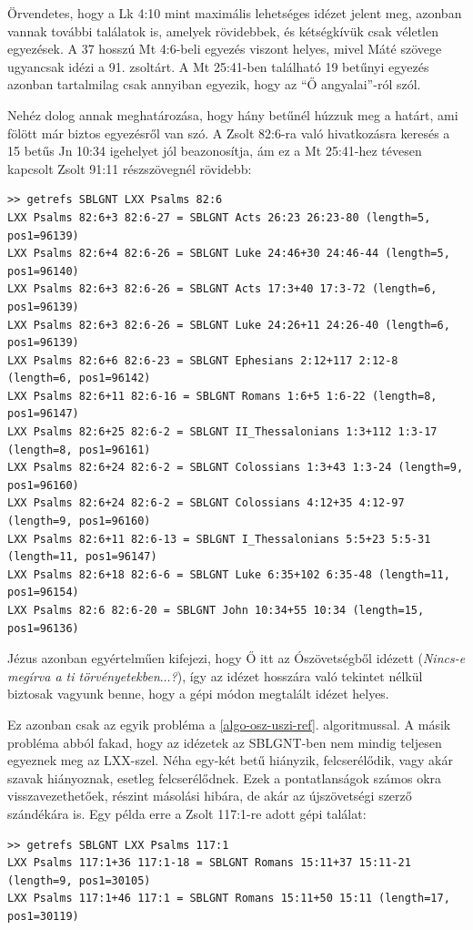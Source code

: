\documentclass{article}
\begin{document}
Örvendetes, hogy a Lk 4:10 mint maximális lehetséges idézet jelent meg, azonban vannak további találatok is,
amelyek rövidebbek, és kétségkívük csak véletlen egyezések. A 37 hosszú Mt 4:6-beli egyezés viszont
helyes, mivel Máté szövege ugyancsak idézi a 91. zsoltárt. A Mt 25:41-ben található 19
betűnyi egyezés azonban tartalmilag csak annyiban egyezik, hogy az ``Ő angyalai''-ról szól.

Nehéz dolog annak meghatározása, hogy hány betűnél húzzuk meg a határt, ami fölött már biztos
egyezésről van szó. A Zsolt 82:6-ra való hivatkozásra keresés a 15 betűs Jn 10:34 igehelyet
jól beazonosítja, ám ez a Mt 25:41-hez tévesen kapcsolt Zsolt 91:11 részszövegnél rövidebb:
\begin{lstlisting}
>> getrefs SBLGNT LXX Psalms 82:6
LXX Psalms 82:6+3 82:6-27 = SBLGNT Acts 26:23 26:23-80 (length=5, pos1=96139)
LXX Psalms 82:6+4 82:6-26 = SBLGNT Luke 24:46+30 24:46-44 (length=5, pos1=96140)
LXX Psalms 82:6+3 82:6-26 = SBLGNT Acts 17:3+40 17:3-72 (length=6, pos1=96139)
LXX Psalms 82:6+3 82:6-26 = SBLGNT Luke 24:26+11 24:26-40 (length=6, pos1=96139)
LXX Psalms 82:6+6 82:6-23 = SBLGNT Ephesians 2:12+117 2:12-8 (length=6, pos1=96142)
LXX Psalms 82:6+11 82:6-16 = SBLGNT Romans 1:6+5 1:6-22 (length=8, pos1=96147)
LXX Psalms 82:6+25 82:6-2 = SBLGNT II_Thessalonians 1:3+112 1:3-17 (length=8, pos1=96161)
LXX Psalms 82:6+24 82:6-2 = SBLGNT Colossians 1:3+43 1:3-24 (length=9, pos1=96160)
LXX Psalms 82:6+24 82:6-2 = SBLGNT Colossians 4:12+35 4:12-97 (length=9, pos1=96160)
LXX Psalms 82:6+11 82:6-13 = SBLGNT I_Thessalonians 5:5+23 5:5-31 (length=11, pos1=96147)
LXX Psalms 82:6+18 82:6-6 = SBLGNT Luke 6:35+102 6:35-48 (length=11, pos1=96154)
LXX Psalms 82:6 82:6-20 = SBLGNT John 10:34+55 10:34 (length=15, pos1=96136)
\end{lstlisting}
Jézus azonban egyértelműen kifejezi, hogy Ő itt az Ószövetségből idézett (\textit{Nincs-e
megírva a ti törvényetekben$\ldots$?}), így az idézet hosszára való tekintet
nélkül biztosak vagyunk benne, hogy a gépi módon megtalált idézet helyes.

Ez azonban csak az egyik probléma a \ref{algo-osz-uszi-ref}. algoritmussal.
A másik probléma abból fakad, hogy az idézetek az SBLGNT-ben nem mindig teljesen egyeznek meg
az LXX-szel. Néha egy-két betű hiányzik, felcserélődik, vagy akár szavak hiányoznak, esetleg
felcserélődnek. Ezek a pontatlanságok számos okra visszavezethetőek, részint másolási
hibára, de akár az újszövetségi szerző szándékára is.
Egy példa erre a Zsolt 117:1-re adott gépi találat:
\begin{lstlisting}
>> getrefs SBLGNT LXX Psalms 117:1
LXX Psalms 117:1+36 117:1-18 = SBLGNT Romans 15:11+37 15:11-21 (length=9, pos1=30105)
LXX Psalms 117:1+46 117:1 = SBLGNT Romans 15:11+50 15:11 (length=17, pos1=30119)
\end{lstlisting}
\end{document}

